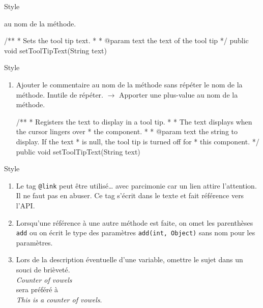 \begin{hideedit}
\begin{frame}[fragile]{Style}
\begin{enumerate}
      au nom de la méthode.\\
      \begin{wrong}
      \begin{java}
/**
  * Sets the tool tip text.
  *
  * @param text the text of the tool tip
  */
  public void setToolTipText(String text)
      \end{java}
      \end{wrong}
  \end{enumerate}
\end{frame}
\begin{frame}[fragile]{Style}
  \begin{enumerate}
    \conti
    \item Ajouter le commentaire au nom de la méthode sans répéter le nom de la
      méthode. Inutile de répéter. \(\rightarrow\) Apporter une plus-value
      au nom de la méthode.\\
      \begin{java}
/**
  * Registers the text to display in a tool tip.
  *
  * The text displays when the cursor lingers over
  * the component.
  *
  * @param text the string to display. If the text
  * is null, the tool tip is turned off for
  * this component.
  */
  public void setToolTipText(String text)
      \end{java}
    \seti
  \end{enumerate}
\end{frame}
\begin{frame}[fragile]{Style}
  \begin{enumerate}[<+->]
    \conti
    \item Le tag \texttt{@link} peut être utilisé… avec parcimonie car un lien
      attire l'attention. Il ne faut pas en abuser. Ce tag s'écrit dans le
      texte et fait référence vers l'API.

    \item Lorsqu'une référence à une autre méthode est faite, on omet les
      parenthèses \texttt{add} ou on écrit le type des paramètres
      \texttt{add(int, Object)} sans nom pour les paramètres. 

    \item Lors de la description éventuelle d'une variable, omettre le sujet
      dans un souci de brièveté.\\
      \medskip
      \quad\textit{Counter of vowels}\\
      sera préféré à\\
      \quad\textit{This is a counter of vowels}.


\end{enumerate}
\end{frame}
\end{hideedit}
